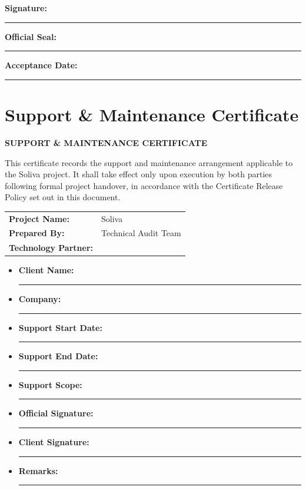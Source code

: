 \documentclass[11pt,a4paper]{article}
\newcommand{\ProjectName}{Soliva}
\newcommand{\TechnologyPartner}{~}              %
\newcommand{\PreparedBy}{Technical Audit Team}
\newcommand{\siglabel}[1]{\textbf{#1:} \rule{7cm}{0.4pt}}
\begin{document}
\vspace{1.2cm}
\noindent\textbf{Signature:} \rule{8cm}{0.4pt}

\vspace{0.9cm}
\noindent\textbf{Official Seal:} \rule{8cm}{0.4pt}

\vspace{0.9cm}
\noindent\textbf{Acceptance Date:} \rule{8cm}{0.4pt}

\newpage
\section{Support \& Maintenance Certificate}
\begin{center}
    {\LARGE\bfseries SUPPORT \& MAINTENANCE CERTIFICATE}\\[1cm]
\end{center}

\noindent This certificate records the support and maintenance arrangement
applicable to the \ProjectName{} project. It shall take effect only upon
execution by both parties following formal project handover, in accordance
with the Certificate Release Policy set out in this document.

\vspace{1cm}
\begin{tabular}{ll}
    \textbf{Project Name:}       & \ProjectName       \\[4pt]
    \textbf{Prepared By:}        & \PreparedBy        \\[4pt]
    \textbf{Technology Partner:} & \TechnologyPartner \\[4pt]
\end{tabular}

\vspace{1cm}
\begin{itemize}[leftmargin=*, itemsep=14pt, label={}]
    \item \siglabel{Client Name}
    \item \siglabel{Company}
    \item \siglabel{Support Start Date}
    \item \siglabel{Support End Date}
    \item \siglabel{Support Scope}
    \item \siglabel{Official Signature}
    \item \siglabel{Client Signature}
    \item \siglabel{Remarks}
\end{itemize}
\end{document}
